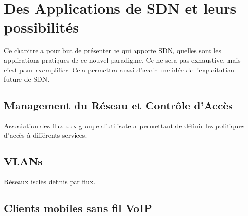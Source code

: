 \chapter{Des Applications de SDN et leurs possibilités}

Ce chapitre a pour but de présenter ce qui apporte SDN, quelles sont les applications pratiques de ce nouvel paradigme. Ce ne sera pas exhaustive, mais c'est pour exemplifier. Cela permettra aussi d'avoir une idée de l'exploitation future de SDN.

\section{Management du Réseau et Contrôle d'Accès}
Association des flux aux groupe d'utilisateur permettant de définir les politiques d'accès à différents services.

\section{VLANs}
Réseaux isolés définis par flux.

\section{Clients mobiles sans fil VoIP}

